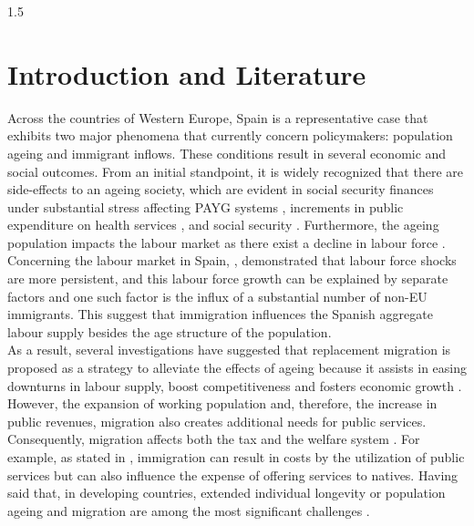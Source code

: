 \documentclass{article}
\begin{document}
\begin{spacing}{1.5}
\section{Introduction and Literature}
Across the countries of Western Europe, Spain is a representative case that exhibits two major phenomena that currently concern policymakers: population ageing and immigrant inflows. These conditions result in several economic and social outcomes. From an initial standpoint, it is widely recognized that there are side-effects to an ageing society, which are evident in social security finances under substantial stress affecting PAYG systems \parencite{diaz2009delaying,boeri2024pay}, increments in public expenditure on health services \parencite{cristea2020impact,aiyar2016impact,bijak2007population}, and social security \parencite{failde2021perspective}. Furthermore, the ageing population impacts the labour market as there exist a decline in labour force \parencite{maestas2023effect}. Concerning the labour market in Spain, \textcite{casares2018labor}, demonstrated that labour force shocks are more persistent, and this labour force growth can be explained by separate factors and one such factor is the influx of a substantial number of non-EU immigrants. This suggest that immigration influences the Spanish aggregate labour supply besides the age structure of the population. \\

 As a result, several investigations have suggested that replacement migration is proposed as a strategy to alleviate the effects of ageing because it assists in easing downturns in labour supply, boost competitiveness and fosters economic growth \parencite{stepanek2022sectoral,okamoto2021immigration,UNATIONS}. However, the expansion of working population and, therefore, the increase in public revenues, migration also creates additional needs for public services. Consequently, migration affects both the tax and the welfare system \parencite{fiorio2023migration,naumann2021population}. For example, as stated in \textcite{preston2014effect}, immigration can result in costs by the utilization of public services but can also influence the expense of offering services to natives. Having said that, in developing countries, extended individual longevity or population ageing and migration are among the most significant challenges \parencite{ciobanu2020intersections}. \\


\end{spacing}
\end{document}
